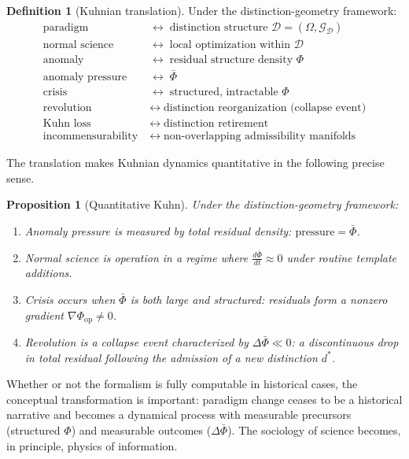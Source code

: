 \documentclass[11pt, a4paper]{article}
\theoremstyle{plain}
\newtheorem{proposition}[theorem]{Proposition}
\theoremstyle{definition}
\newtheorem{definition}[theorem]{Definition}
\theoremstyle{remark}
\newcommand{\Dist}{\mathcal{D}}
\newcommand{\PhiF}{\varPhi}
\newcommand{\PhiFop}{\varPhi_{\mathrm{op}}}
\newcommand{\DG}{\mathcal{G}_{\Dist}}
\begin{document}
\begin{definition}[Kuhnian translation]
\label{def:kuhn}
Under the distinction-geometry framework:
\begin{align*}
  \text{paradigm} &\;\longleftrightarrow\; \text{distinction structure } \Dist = (\Omega, \DG) \\
  \text{normal science} &\;\longleftrightarrow\; \text{local optimization within } \Dist \\
  \text{anomaly} &\;\longleftrightarrow\; \text{residual structure density } \PhiF \\
  \text{anomaly pressure} &\;\longleftrightarrow\; \bar\PhiF \\
  \text{crisis} &\;\longleftrightarrow\; \text{structured, intractable } \PhiF \\
  \text{revolution} &\;\longleftrightarrow\; \text{distinction reorganization (collapse event)} \\
  \text{Kuhn loss} &\;\longleftrightarrow\; \text{distinction retirement} \\
  \text{incommensurability} &\;\longleftrightarrow\; \text{non-overlapping admissibility manifolds}
\end{align*}
\end{definition}

The translation makes Kuhnian dynamics quantitative in the following
precise sense.

\begin{proposition}[Quantitative Kuhn]
\label{prop:kuhn-quant}
Under the distinction-geometry framework:
\begin{enumerate}[label=(\roman*)]
  \item \emph{Anomaly pressure} is measured by total residual density:
        $\text{pressure} = \bar\PhiF$.
  \item \emph{Normal science} is operation in a regime where
        $\frac{d\bar\PhiF}{dt} \approx 0$ under routine template additions.
  \item \emph{Crisis} occurs when $\bar\PhiF$ is both large and structured:
        residuals form a nonzero gradient $\nabla\PhiFop \neq 0$.
  \item \emph{Revolution} is a collapse event characterized by
        $\Delta\bar\PhiF \ll 0$: a discontinuous drop in total residual
        following the admission of a new distinction $d^*$.
\end{enumerate}
\end{proposition}

Whether or not the formalism is fully computable in historical cases,
the conceptual transformation is important: paradigm change ceases to
be a historical narrative and becomes a dynamical process with
measurable precursors (structured $\PhiF$) and measurable outcomes
($\Delta\bar\PhiF$). The sociology of science becomes, in principle,
physics of information.
\end{document}
